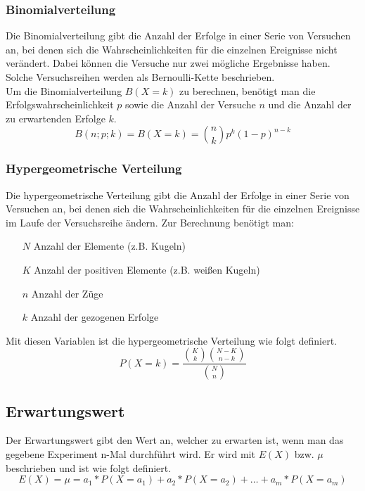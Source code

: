 \documentclass[a4paper]{article}
\begin{document}
			\subsubsection{Binomialverteilung}
				Die Binomialverteilung gibt die Anzahl der Erfolge in einer Serie von Versuchen an, bei denen sich die Wahrscheinlichkeiten für die einzelnen Ereignisse nicht verändert. Dabei können die Versuche nur zwei mögliche Ergebnisse haben. Solche Versuchsreihen werden als Bernoulli-Kette beschrieben.\\
				Um die Binomialverteilung $B(X = k)$ zu berechnen, benötigt man die Erfolgswahrscheinlichkeit $p$ sowie die Anzahl der Versuche $n$ und die Anzahl der zu erwartenden Erfolge $k$.
				\begin{equation}
					B(n; p; k) = B(X = k) = \binom{n}{k} p^k (1 - p)^{n-k}
				\end{equation}
			\subsubsection{Hypergeometrische Verteilung}
				Die hypergeometrische Verteilung gibt die Anzahl der Erfolge in einer Serie von Versuchen an, bei denen sich die Wahrscheinlichkeiten für die einzelnen Ereignisse im Laufe der Versuchsreihe ändern. Zur Berechnung benötigt man:
				\begin{itemize}
					\item[$N$] Anzahl der Elemente (z.B. Kugeln)
					\item[$K$] Anzahl der positiven Elemente (z.B. weißen Kugeln)
					\item[$n$] Anzahl der Züge
					\item[$k$] Anzahl der gezogenen Erfolge
				\end{itemize}
				
				\noindent
				Mit diesen Variablen ist die hypergeometrische Verteilung wie folgt definiert.
				\begin{equation}
					P\left(X = k\right) = \frac{
						\binom{K}{k}
						\binom{N-K}{n-k}
					}{
						\binom{N}{n}
					}
				\end{equation}
			
		\subsection{Erwartungswert}
			Der Erwartungswert gibt den Wert an, welcher zu erwarten ist, wenn man das gegebene Experiment n-Mal durchführt wird. Er wird mit $E\left(X\right)$ bzw. $\mu$ beschrieben und ist wie folgt definiert.
			\begin{equation}
				E(X) = \mu = a_1 * P(X = a_1) + a_2 * P(X = a_2) + \dotsc + a_m * P(X = a_m)
			\end{equation}
			
\end{document}
